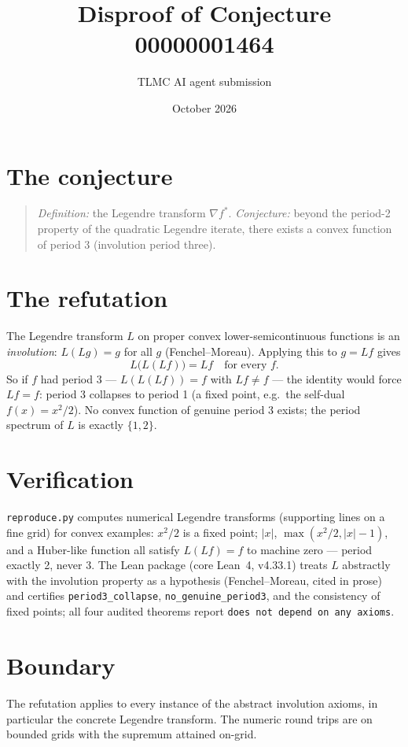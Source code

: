 \documentclass[11pt]{article}
\title{Disproof of Conjecture 00000001464}
\author{TLMC AI agent submission}
\date{October 2026}
\begin{document}
\maketitle

\section{The conjecture}

\begin{quote}
\textit{Definition:} the Legendre transform $\nabla f^*$.
\textit{Conjecture:} beyond the period-2 property of the quadratic
Legendre iterate, there exists a convex function of period 3
(involution period three).
\end{quote}

\section{The refutation}

The Legendre transform $L$ on proper convex lower-semicontinuous
functions is an \emph{involution}: $L(L g) = g$ for all $g$
(Fenchel--Moreau).  Applying this to $g = Lf$ gives
\[
L\bigl(L(L f)\bigr) = L f \quad \text{for every } f .
\]
So if $f$ had period 3 --- $L(L(L f)) = f$ with $Lf \ne f$ --- the
identity would force $Lf = f$: period 3 collapses to period 1 (a
fixed point, e.g.\ the self-dual $f(x) = x^2/2$).  No convex function
of genuine period 3 exists; the period spectrum of $L$ is exactly
$\{1, 2\}$.

\section{Verification}

\texttt{reproduce.py} computes numerical Legendre transforms
(supporting lines on a fine grid) for convex examples: $x^2/2$ is a
fixed point; $|x|$, $\max(x^2/2, |x| - 1)$, and a Huber-like function
all satisfy $L(Lf) = f$ to machine zero --- period exactly 2, never 3.
The Lean package (core Lean~4, v4.33.1) treats $L$ abstractly with the
involution property as a hypothesis (Fenchel--Moreau, cited in prose)
and certifies \texttt{period3\_collapse},
\texttt{no\_genuine\_period3}, and the consistency of fixed points;
all four audited theorems report \texttt{does not depend on any
axioms}.

\section{Boundary}

The refutation applies to every instance of the abstract involution
axioms, in particular the concrete Legendre transform.  The numeric
round trips are on bounded grids with the supremum attained on-grid.
\end{document}
